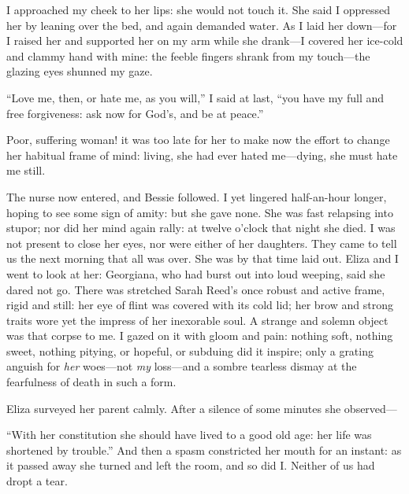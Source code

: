 I approached my cheek to her lips: she would not touch it. She said I
oppressed her by leaning over the bed, and again demanded water. As I
laid her down---for I raised her and supported her on my arm while she
drank---I covered her ice-cold and clammy hand with mine: the feeble
fingers shrank from my touch---the glazing eyes shunned my gaze.

\enquote{Love me, then, or hate me, as you will,} I said at last,
\enquote{you have my full and free forgiveness: ask now for God's, and
be at peace.}

Poor, suffering woman! it was too late for her to make now the effort to
change her habitual frame of mind: living, she had ever hated
me---dying, she must hate me still.

The nurse now entered, and Bessie followed. I yet lingered half-an-hour
longer, hoping to see some sign of amity: but she gave none. She was
fast relapsing into stupor; nor did her mind again rally: at twelve
o'clock that night she died. I was not present to close her eyes, nor
were either of her daughters. They came to tell us the next morning
that all was over. She was by that time laid out. Eliza and I went to
look at her: Georgiana, who had burst out into loud weeping, said she
dared not go. There was stretched Sarah Reed's once robust and active
frame, rigid and still: her eye of flint was covered with its cold lid;
her brow and strong traits wore yet the impress of her inexorable soul. 
A strange and solemn object was that corpse to me. I gazed on it with
gloom and pain: nothing soft, nothing sweet, nothing pitying, or
hopeful, or subduing did it inspire; only a grating anguish for
\emph{her} woes---not \emph{my} loss---and a sombre tearless dismay at
the fearfulness of death in such a form.

Eliza surveyed her parent calmly. After a silence of some minutes she
observed---

\enquote{With her constitution she should have lived to a good old age:
her life was shortened by trouble.} And then a spasm constricted her
mouth for an instant: as it passed away she turned and left the room,
and so did I\@. Neither of us had dropt a tear.
